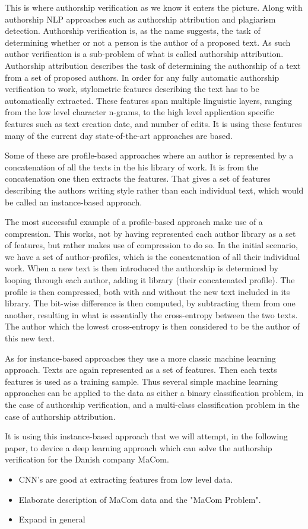 This is where authorship verification as we know it enters the picture. Along
with authorship \gls{NLP} approaches such as authorship attribution and
plagiarism detection. Authorship verification is, as the name suggests, the task
of determining whether or not a person is the author of a proposed text. As such
author verification is a sub-problem of what is called authorship attribution.
Authorship attribution describes the task of determining the authorship of a
text from a set of proposed authors. In order for any fully automatic authorship
verification to work, stylometric features describing the text has to be
automatically extracted. These features span multiple linguistic layers, ranging
from the low level character n-grams, to the high level application specific
features such as text creation date, and number of edits. It is using these
features many of the current day state-of-the-art approaches are based.

Some of these are profile-based approaches where an author is represented by
a concatenation of all the texts in the his library of work. It is from the
concatenation one then extracts the features. That gives a set of features
describing the authors writing style rather than each individual text, which
would be called an instance-based approach.

The most successful example of a profile-based approach make use of a
compression. This works, not by having represented each author library as a
set of features, but rather makes use of compression to do so. In the initial
scenario, we have a set of author-profiles, which is the concatenation of
all their individual work. When a new text is then introduced the authorship
is determined by looping through each author, adding it library (their
concatenated profile). The profile is then compressed, both with and without
the new text included in its library. The bit-wise difference is then computed,
by subtracting them from one another, resulting in what is essentially the
cross-entropy between the two texts. The author which the lowest cross-entropy
is then considered to be the author of this new text.

As for instance-based approaches they use a more classic machine learning
approach. Texts are again represented as a set of features. Then each texts
features is used as a training sample. Thus several simple machine learning
approaches can be applied to the data as either a binary classification problem,
in the case of authorship verification, and a multi-class classification problem
in the case of authorship attribution.

It is using this instance-based approach that we will attempt, in the following
paper, to device a deep learning approach which can solve the authorship
verification for the Danish company MaCom.


\begin{itemize}
    \item CNN's are good at extracting features from low level data.
    \item Elaborate description of MaCom data and the "MaCom Problem".
    \item Expand in general
\end{itemize}
